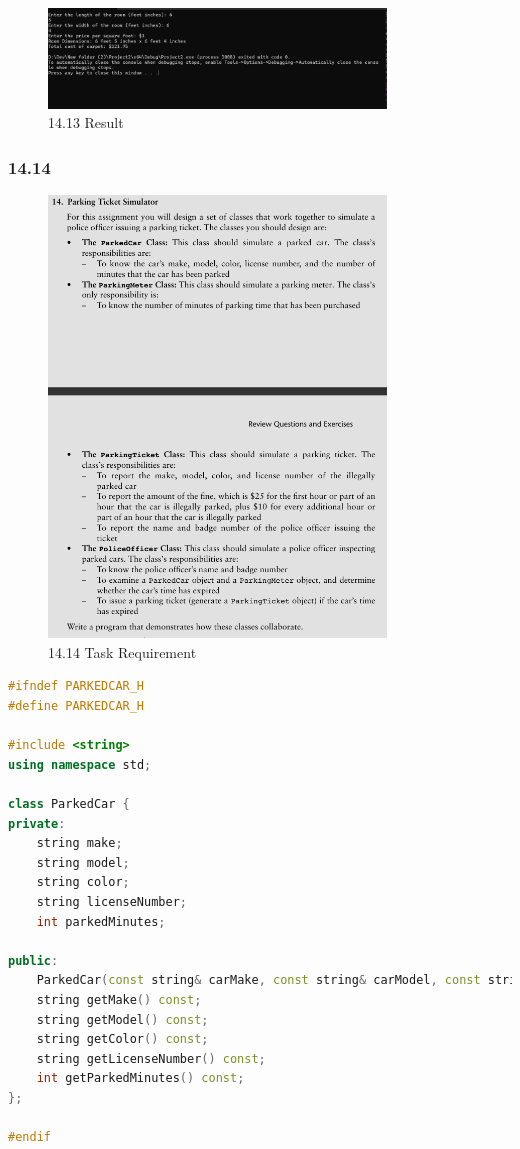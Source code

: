 \documentclass{article}
\begin{document}
\begin{figure}[H]
    \centering
    \includegraphics[width=0.8\textwidth]{./Assets/Results/Assignment12/3.png}
    \caption{14.13 Result}
\end{figure}

\subsubsection*{14.14}

\begin{figure}[H]
    \centering
    \includegraphics[width=0.8\textwidth]{./Assets/Task requirements/Assignment12/14.14.png}
    \caption{14.14 Task Requirement}
\end{figure}

\begin{lstlisting}[language=C++, caption={ParkedCar.h}]
#ifndef PARKEDCAR_H
#define PARKEDCAR_H

#include <string>
using namespace std;

class ParkedCar {
private:
    string make;
    string model;
    string color;
    string licenseNumber;
    int parkedMinutes;

public:
    ParkedCar(const string& carMake, const string& carModel, const string& carColor, const string& license, int minutesParked);
    string getMake() const;
    string getModel() const;
    string getColor() const;
    string getLicenseNumber() const;
    int getParkedMinutes() const;
};

#endif
\end{lstlisting}
\end{document}
